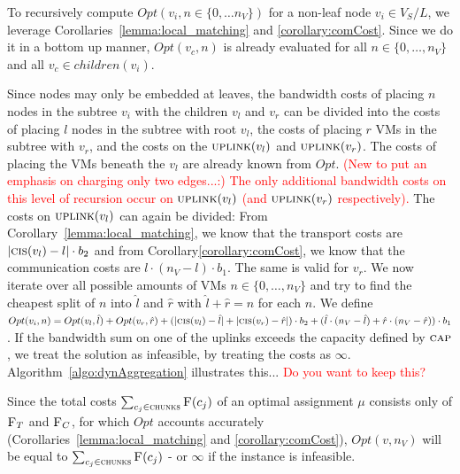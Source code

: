 \documentclass[9pt,twocolumn]{scrartcl}
\newcommand{\Capacity}{\ensuremath{\textsc{cap}}}
\newcommand{\carlo}[1]{\textcolor{red}{#1}}
\newcommand{\VmChunkAssignment}{\mu}
\newcommand{\SubstrateNodes}{\ensuremath{V_S}}
\newcommand{\SubstrateNode}{\ensuremath{v}}
\newcommand{\Leaves}{\ensuremath{L}}
\newcommand{\Chunks}{\ensuremath{\textsc{chunks}}}
\newcommand{\Opt}{\ensuremath{Opt}}
\newcommand{\Children}{\ensuremath{children}}
\newcommand{\Uplink}{\ensuremath{\textsc{uplink}}}
\newcommand{\ChunkCount}{\ensuremath{\textsc{cis}}}
\newcommand{\achunk}{\ensuremath{c}}
\newcommand{\Cost}{\textsc{F}}
\newcommand{\CostCom}{\ensuremath{b_1}}
\newcommand{\CostTrans}{\ensuremath{b_2}}
\newcommand{\Vms}{\ensuremath{n_V}}
\begin{document}
To recursively compute $\Opt(\SubstrateNode_i, n \in \{0,\dots\Vms\})$ for a
non-leaf node $\SubstrateNode_i \in \SubstrateNodes / \Leaves$, we leverage
Corollaries~\ref{lemma:local_matching} and \ref{corollary:comCost}. Since
we do it in a bottom up manner, $\Opt(\SubstrateNode_c, n)$
is already evaluated for all $n \in \{0,\dots,\Vms\}$ and all
$\SubstrateNode_c \in \Children(\SubstrateNode_i)$.

Since nodes may only be embedded at leaves, the bandwidth costs of placing $n$ nodes
in the subtree $\SubstrateNode_i$ with the children $\SubstrateNode_l$ and
$\SubstrateNode_r$ can be divided into the costs of placing $l$ nodes in the
subtree with root $\SubstrateNode_l$, the costs of placing
$r$ VMs in the subtree with $\SubstrateNode_r$, and the costs on the
$\Uplink(\SubstrateNode_l)$ and $\Uplink(\SubstrateNode_r)$. The costs of
placing the VMs beneath the $\SubstrateNode_l$ are already known from
$\Opt$. \carlo{(New to put an emphasis on charging only two edges...:) The only
additional bandwidth costs on this level of recursion occur on
$\Uplink(\SubstrateNode_l)$ (and $\Uplink(\SubstrateNode_r)$ respectively).}
The costs on $\Uplink(\SubstrateNode_l)$ can again be divided: From
Corollary~\ref{lemma:local_matching}, we know that the transport costs are
 $|\ChunkCount(\SubstrateNode_l) - l| \cdot \CostTrans$ and from
Corollary\ref{corollary:comCost}, we know that the communication costs are
$l\cdot (\Vms - l) \cdot \CostCom$. The same is valid for $\SubstrateNode_r$.
We now iterate over all possible amounts of VMs $n \in \{0,\dots,\Vms\}$ and
try to find the cheapest split of $n$ into $\hat l$ and $\hat r$ with
$\hat l + \hat r = n$ for each $n$. We define $\Opt(\SubstrateNode_i, n) =
\Opt(\SubstrateNode_{l}, \hat l) + \Opt(\SubstrateNode_{r}, \hat r) +
(|\ChunkCount(\SubstrateNode_{l}) - \hat
l|+|\ChunkCount(\SubstrateNode_{r}) - \hat r|) \cdot \CostTrans + (\hat
l\cdot (\Vms - \hat l) + \hat r\cdot (\Vms - \hat r)) \cdot \CostCom$. If the
bandwidth sum on one of the uplinks exceeds the capacity defined by
$\Capacity$, we treat the solution as infeasible, by treating the costs as
$\infty$. Algorithm~\ref{algo:dynAggregation} illustrates this... \carlo{Do you
want to keep this?}

Since the total costs $\sum_{\achunk_j \in
\Chunks}\Cost(\achunk_j)$ of an optimal assignment $\VmChunkAssignment$
consists only of $\Cost_T$ and $\Cost_C$, for which $\Opt$ accounts accurately
(Corollaries~\ref{lemma:local_matching} and \ref{corollary:comCost}),
$\Opt(\SubstrateNode, \Vms)$ will be equal to $\sum_{\achunk_j \in
\Chunks}\Cost(\achunk_j)$ - or $\infty$ if the instance is infeasible.
\end{document}
